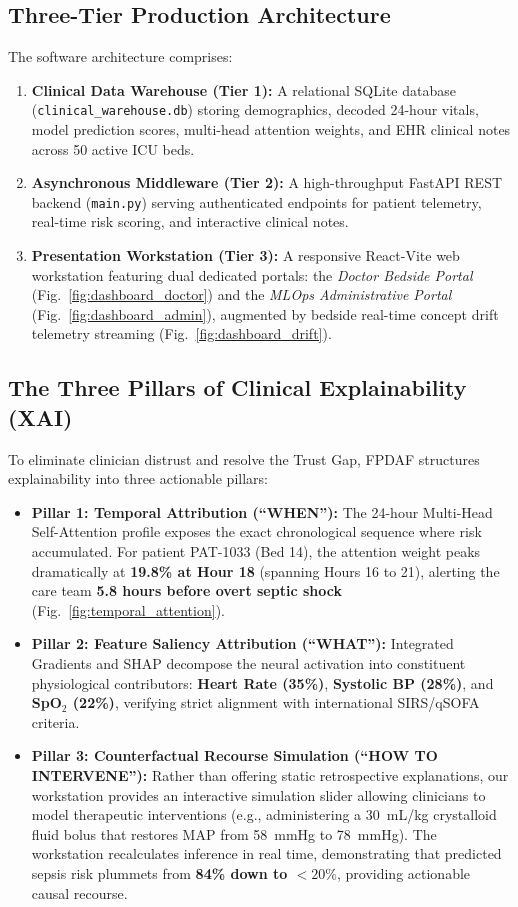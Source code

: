 \documentclass[journal,twocolumn,10pt]{IEEEtran}
\begin{document}
\subsection{Three-Tier Production Architecture}
The software architecture comprises:
\begin{enumerate}
    \item \textbf{Clinical Data Warehouse (Tier 1):} A relational SQLite database (\texttt{clinical\_warehouse.db}) storing demographics, decoded 24-hour vitals, model prediction scores, multi-head attention weights, and EHR clinical notes across 50 active ICU beds.
    \item \textbf{Asynchronous Middleware (Tier 2):} A high-throughput FastAPI REST backend (\texttt{main.py}) serving authenticated endpoints for patient telemetry, real-time risk scoring, and interactive clinical notes.
    \item \textbf{Presentation Workstation (Tier 3):} A responsive React-Vite web workstation featuring dual dedicated portals: the \textit{Doctor Bedside Portal} (Fig.~\ref{fig:dashboard_doctor}) and the \textit{MLOps Administrative Portal} (Fig.~\ref{fig:dashboard_admin}), augmented by bedside real-time concept drift telemetry streaming (Fig.~\ref{fig:dashboard_drift}).
\end{enumerate}

\subsection{The Three Pillars of Clinical Explainability (XAI)}
To eliminate clinician distrust and resolve the Trust Gap, FPDAF structures explainability into three actionable pillars:
\begin{itemize}
    \item \textbf{Pillar 1: Temporal Attribution (``WHEN''):} The 24-hour Multi-Head Self-Attention profile exposes the exact chronological sequence where risk accumulated. For patient PAT-1033 (Bed 14), the attention weight peaks dramatically at \textbf{19.8\% at Hour 18} (spanning Hours 16 to 21), alerting the care team \textbf{5.8 hours before overt septic shock} (Fig.~\ref{fig:temporal_attention}).
    
    \item \textbf{Pillar 2: Feature Saliency Attribution (``WHAT''):} Integrated Gradients and SHAP decompose the neural activation into constituent physiological contributors: \textbf{Heart Rate (35\%)}, \textbf{Systolic BP (28\%)}, and \textbf{SpO$_2$ (22\%)}, verifying strict alignment with international SIRS/qSOFA criteria.
    
    \item \textbf{Pillar 3: Counterfactual Recourse Simulation (``HOW TO INTERVENE''):} Rather than offering static retrospective explanations, our workstation provides an interactive simulation slider allowing clinicians to model therapeutic interventions (e.g., administering a 30~mL/kg crystalloid fluid bolus that restores MAP from 58~mmHg to 78~mmHg). The workstation recalculates inference in real time, demonstrating that predicted sepsis risk plummets from \textbf{84\% down to $<20\%$}, providing actionable causal recourse.
\end{itemize}
\end{document}
